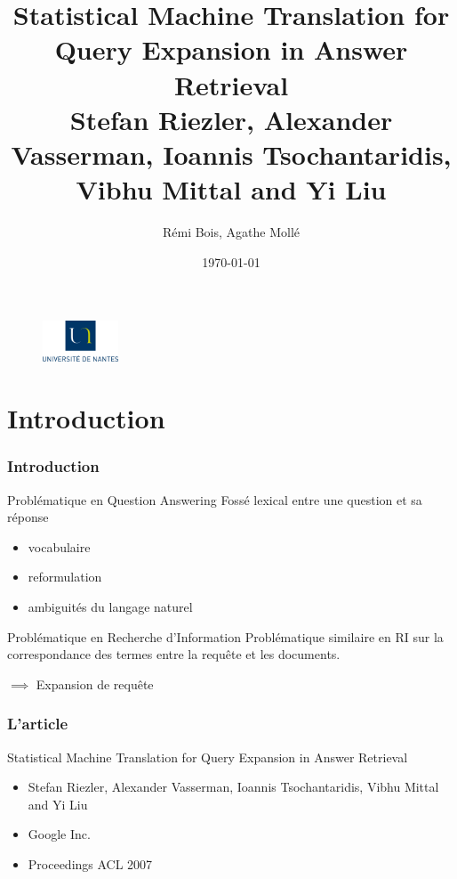 \documentclass[10pt]{beamer}
\title{Statistical Machine Translation for Query Expansion in Answer
  Retrieval\cite{Riezler07}\\ 
\small
Stefan Riezler, Alexander Vasserman, Ioannis Tsochantaridis, Vibhu
Mittal and Yi Liu}
\author{Rémi Bois, Agathe Mollé}
\date{\today}
\begin{document}
\begin{frame}
  \maketitle
  \vfill
  \begin{figure}
    \includegraphics[width=0.20\textwidth]{logo_univ_nantes}
  \end{figure}

\end{frame}

\begin{frame}
  \tableofcontents
\end{frame}

\section{Introduction}
\label{sec:intro}

\begin{frame}
  \frametitle{Introduction}
  \begin{block}{Problématique en Question Answering}
  Fossé lexical entre une question et sa réponse
  \begin{itemize}
    \item vocabulaire
    \item reformulation
    \item ambiguités du langage naturel
  \end{itemize}
  \end{block}
  
  \pause
  
  \begin{block}{Problématique en Recherche d'Information}
  Problématique similaire en RI sur la correspondance des termes entre la requ\^ete et les documents.
  
  $\implies$ Expansion de requ\^ete
  \end{block}
\end{frame}

\begin{frame}
  \frametitle{L'article}  
  \begin{block}{Statistical Machine Translation for Query Expansion in Answer Retrieval}
  \begin{itemize}
    \item Stefan Riezler, Alexander Vasserman, Ioannis Tsochantaridis, Vibhu Mittal and Yi Liu
    \item Google Inc.
    \item Proceedings ACL 2007
  \end{itemize}
  \end{block}
\end{frame}
\end{document}
